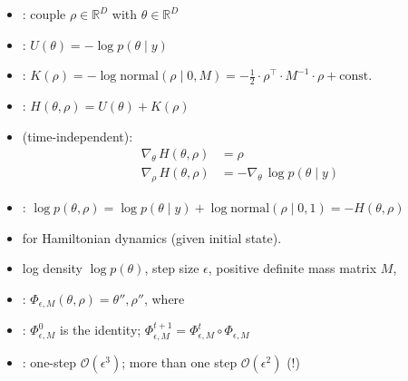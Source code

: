 \documentclass[10pt]{report}
\begin{document}
\begin{itemize}
\item {}: couple  $\rho \in
  \mathbb{R}^D$ with  $\theta \in \mathbb{R}^D$
\item {}: $U(\theta) = -\log p(\theta \mid y)$
\item {}: $K(\rho) = -\log \textrm{normal}(\rho
  \mid 0, M) = -\frac{1}{2} \cdot \rho^{\top} \cdot M^{-1} \cdot
  \rho + \textrm{const.}$
\item {}: $H(\theta, \rho) = U(\theta) + K(\rho)$
\item {} (time-independent):
  \begin{align*}
  \nabla_\theta \, H(\theta, \rho) &= \rho
  \\[4pt]                                     
  \nabla_\rho \, H(\theta, \rho) &= -\nabla_{\theta} \, \log
  p(\theta \mid y)
  \end{align*}
  \item {}: $\log p(\theta, \rho) = \log p(\theta \mid y) + \log \textrm{normal}(\rho \mid 0, 1) = -H(\theta, \rho)$
\end{itemize}

\begin{itemize}
\item {} for Hamiltonian dynamics (given initial state).
\item {} log density $\log p(\theta)$, step size
  $\epsilon$, positive definite mass matrix $M$, 
\item {}: $\Phi_{\epsilon, M}(\theta, \rho) = \theta'', \rho''$, where
\item {}: $\Phi^0_{\epsilon, M}$ is the
  identity; \quad $\Phi^{t + 1}_{\epsilon, M} = \Phi^t_{\epsilon,M} \circ
  \Phi_{\epsilon,M}$
\item {}: one-step $\mathcal{O}(\epsilon^3)$; more than
  one step $\mathcal{O}(\epsilon^2)$ (!)
\end{itemize}
\end{document}
